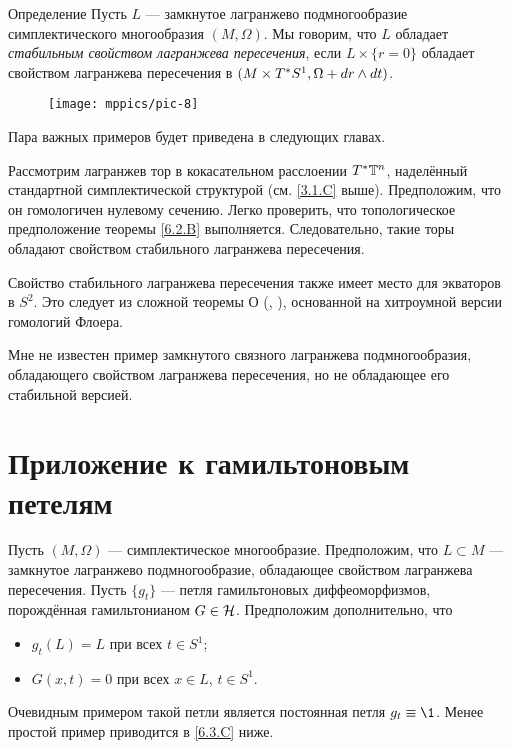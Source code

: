 \begin{ex}{Определение}\label{6.2.C}
Пусть $L$ --- замкнутое лагранжево подмногообразие симплектического многообразия $(M, \Omega)$.
Мы говорим, что $L$ обладает \emph{стабильным свойством лагранжева пересечения}, если $L \times \{r = 0\}$ обладает свойством лагранжева пересечения в $(M \times T^\ast S^1, \Omega + d r \wedge d t)$.
\end{ex}


\begin{wrapfigure}{o}{25 mm}
\vskip-3mm
\centering
\texttt{[image: mppics/pic-8]}
\caption{}\label{pic-8}
\vskip0mm
\end{wrapfigure}


Пара важных примеров будет приведена в следующих главах.

\begin{ex}{}\label{6.2.D}
Рассмотрим лагранжев тор в кокасательном расслоении $T^\ast \mathbb{T}^n$, наделённый стандартной симплектической структурой (см. \ref{3.1.C} выше).
Предположим, что он гомологичен нулевому сечению.
Легко проверить, что топологическое предположение теоремы \ref{6.2.B} выполняется.
Следовательно, такие торы обладают свойством стабильного лагранжева пересечения.
\end{ex}




\begin{ex}[Экватор на $S^2$.]{}\label{6.2.E}
Свойство стабильного лагранжева пересечения также имеет место для экваторов в $S^2$.
Это следует из сложной теоремы О (\cite{O1}, \cite{O2}), основанной на хитроумной версии гомологий Флоера.
\end{ex}


Мне не известен пример замкнутого связного лагранжева подмногообразия, обладающего свойством лагранжева пересечения, но не обладающее его стабильной версией.


\section{Приложение к гамильтоновым петелям}

Пусть $(M, \Omega)$ --- симплектическое многообразие.
Предположим, что $L \subset M$ --- замкнутое лагранжево
подмногообразие, обладающее свойством 
лагранжева пересечения.  
Пусть $\{g_t\}$ --- петля гамильтоновых диффеоморфизмов, порождённая
гамильтонианом $G \in \mathcal{H}$. 
Предположим дополнительно, что
\begin{itemize}
\item $g_t (L) = L$ при всех $t \in S^1$; 
\item $G (x, t) = 0$ при всех $x \in L$, $t \in S^1$.
\end{itemize}
Очевидным примером такой петли является постоянная петля $g_t \z\equiv \1$.
Менее простой пример приводится в \ref{6.3.C} ниже.

